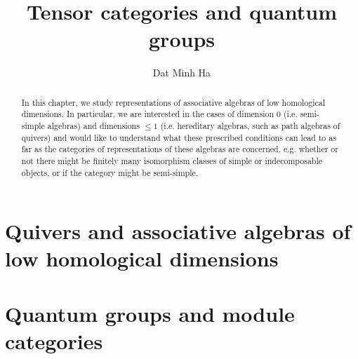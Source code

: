 

\setcounter{section}{-1}





	\title{Tensor categories and quantum groups}
	
	\author{Dat Minh Ha}
	\maketitle
	
	\begin{abstract}
	    
	\end{abstract}
	
	{
      \hypersetup{} 
      \dominitoc
      \tableofcontents %
    }
    
    \chapter{Quivers and associative algebras of low homological dimensions}
        \begin{abstract}
            In this chapter, we study representations of associative algebras of low homological dimensions. In particular, we are interested in the cases of dimension $0$ (i.e. semi-simple algebras) and dimensions $\leq 1$ (i.e. hereditary algebras, such as path algebras of quivers) and would like to understand what these prescribed conditions can lead to as far as the categories of representations of these algebras are concerned, e.g. whether or not there might be finitely many isomorphism classes of simple or indecomposable objects, or if the category might be semi-simple. 
        \end{abstract}
        
        \minitoc
        
        
        
        
        
        
        
        
    
    \chapter{Quantum groups and module categories}
        \begin{abstract}
            
        \end{abstract}
        
